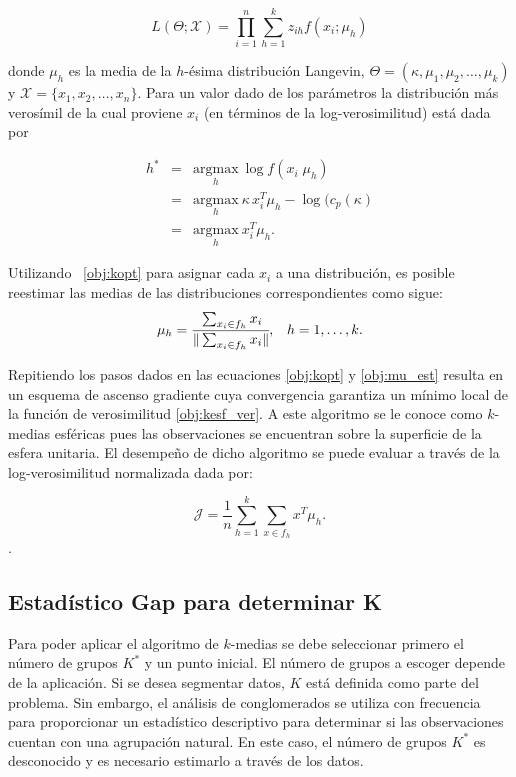  
\begin{equation} \label{obj:kesf_ver}
L(\Theta;\mathcal{X})=\prod_{i=1}^{n} \sum_{h=1}^k z_{ih} f(x_{i};\mu_{h})
\end{equation}
 
 donde $\mu_{h}$ es la media de la $h$-ésima distribución Langevin, $\Theta = (\kappa ,\mu_{1}, \mu_{2},\dots, \mu_{k})$ y $\mathcal{X} = \lbrace x_1, x_2, \dots, x_n \rbrace$. Para un valor dado de los parámetros la distribución más verosímil de la cual proviene $x_{i}$ (en términos de la log-verosimilitud) está dada por
 
\begin{eqnarray}\label{obj:kopt}
 h^\ast&=& \underset{h}{\textrm{argmax}} \: \log f(x_{i} \; \mu_{h})\nonumber \\ 
 		  &=& \underset{h}{\textrm{argmax}} \: \kappa \,
 x_{i}^T\mu_{h} - \log (c_p(\kappa) \nonumber \\
 &=& \underset{h}{\textrm{argmax}} \: x_{i}^T\mu_{h}. 
 \end{eqnarray}
 
Utilizando ~\ref{obj:kopt} para asignar cada $x_{i}$ a una distribución, es posible reestimar las medias de las distribuciones correspondientes como sigue:
\begin{eqnarray}\label{obj:mu_est}
\mu_{h} = \cfrac{\sum_{x_i \in f_{h}} x_{i}}{\|\sum_{x_i \in f_{h}} x_{i}\|} & , & h = 1, \dots , k .
\end{eqnarray}

Repitiendo los pasos dados en las ecuaciones \ref{obj:kopt} y \ref{obj:mu_est} resulta en un esquema de ascenso gradiente cuya convergencia garantiza un mínimo local de la función de verosimilitud  \ref{obj:kesf_ver}. A este algoritmo se le conoce como $k$-medias esféricas pues las observaciones se encuentran sobre la superficie de la esfera unitaria. El desempeño de dicho algoritmo se puede evaluar a través de la log-verosimilitud normalizada dada por:

\begin{equation}
  \mathcal{J} = \frac{1}{n} \sum_{h=1}^{k} \sum_{x \in f_{h}} x^T\mu_h.
\end{equation}.
 


\subsection{Estadístico Gap para determinar K}
Para poder aplicar el algoritmo de $k$-medias se debe seleccionar primero el número de grupos $K^\ast$ y un punto inicial. El número de grupos a escoger depende de la aplicación. Si se desea segmentar datos, $K$ está definida como parte del problema. Sin embargo, el análisis de conglomerados se utiliza con frecuencia para proporcionar un estadístico descriptivo para determinar si las observaciones cuentan con una agrupación natural. En este caso, el número de grupos $K^\ast$ es desconocido y es necesario estimarlo a través de los datos.

